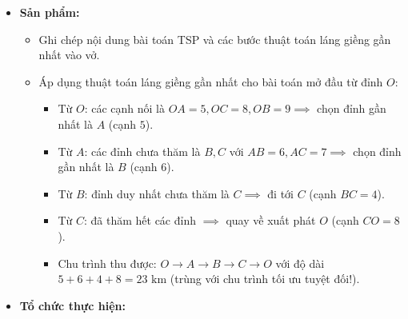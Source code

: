 \documentclass[12pt, a4paper]{article}
\begin{document}
\begin{itemize}[leftmargin=1.2cm]
    \item[c)] \textbf{Sản phẩm:}
    \begin{itemize}[leftmargin=0.6cm]
        \item Ghi chép nội dung bài toán TSP và các bước thuật toán láng giềng gần nhất vào vở.
        \item Áp dụng thuật toán láng giềng gần nhất cho bài toán mở đầu từ đỉnh $O$:
        \begin{itemize}
            \item Từ $O$: các cạnh nối là $OA=5, OC=8, OB=9 \implies$ chọn đỉnh gần nhất là $A$ (cạnh $5$).
            \item Từ $A$: các đỉnh chưa thăm là $B, C$ với $AB=6, AC=7 \implies$ chọn đỉnh gần nhất là $B$ (cạnh $6$).
            \item Từ $B$: đỉnh duy nhất chưa thăm là $C \implies$ đi tới $C$ (cạnh $BC=4$).
            \item Từ $C$: đã thăm hết các đỉnh $\implies$ quay về xuất phát $O$ (cạnh $CO=8$).
            \item Chu trình thu được: $O \to A \to B \to C \to O$ với độ dài $5 + 6 + 4 + 8 = 23\text{ km}$ (trùng với chu trình tối ưu tuyệt đối!).
        \end{itemize}
    \end{itemize}

    \item[d)] \textbf{Tổ chức thực hiện:}
\end{itemize}
\end{document}
